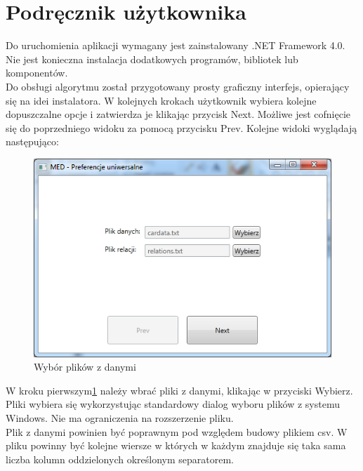 \documentclass[a4paper,12pt]{article}
\begin{document}
\newpage
\appendix
\section{Podręcznik użytkownika}

Do uruchomienia aplikacji wymagany jest zainstalowany .NET Framework 4.0. Nie jest konieczna instalacja dodatkowych programów, bibliotek lub komponentów.\\

Do obsługi algorytmu został przygotowany prosty graficzny interfejs, opierający
się na idei instalatora. W kolejnych krokach użytkownik wybiera kolejne dopuszczalne opcje i zatwierdza je klikając przycisk Next. Możliwe jest cofnięcie się do poprzedniego widoku za pomocą przycisku Prev. Kolejne widoki wyglądają następująco:

\begin{figure}[h!]
\begin{center}
\includegraphics[width=\textwidth]{img/1.png}
\caption{Wybór plików z danymi}
\label{krok1}
\end{center}
\end{figure}

W kroku pierwszym\ref{krok1} należy wbrać pliki z danymi, klikając w przyciski Wybierz. Pliki wybiera się wykorzystując standardowy dialog wyboru plików z systemu Windows. Nie ma ograniczenia na rozszerzenie pliku.\\

Plik z danymi powinien być poprawnym pod względem budowy plikiem csv. W pliku powinny być kolejne wiersze w których w każdym znajduje się taka sama liczba kolumn oddzielonych określonym separatorem.\\
\end{document}

